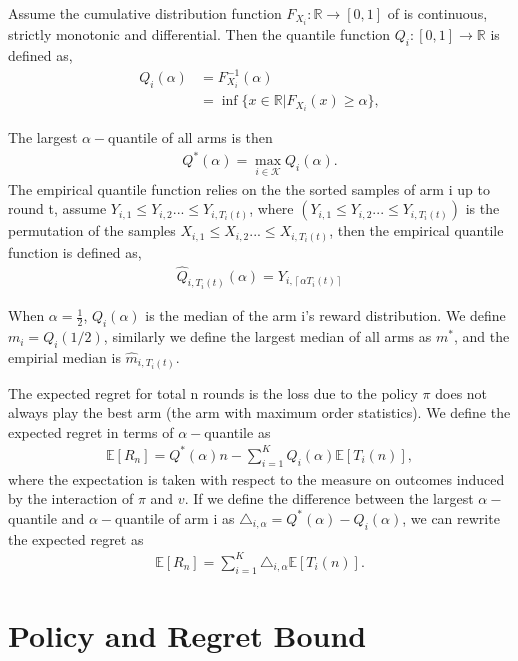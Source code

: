 \documentclass{article}
\theoremstyle{plain}
\begin{document}
    Assume the cumulative distribution function $F_{X_i}: \mathbb{R} \rightarrow [0,1]$ of  is continuous, strictly monotonic and differential. Then the quantile function $Q_{i}:  [0,1]\rightarrow \mathbb{R}$ is defined as,
\begin{align}
    Q_{i}(\alpha) &= F_{X_i}^{-1}(\alpha)\\
    &= \inf \{x \in \mathbb{R}| F_{X_i}(x) \geq \alpha\},
\end{align}

The largest $\alpha-$quantile of all arms is then
\begin{align}
    Q^\ast(\alpha) = \max_{i\in \mathcal{K}} Q_{i}(\alpha).
\end{align}
The empirical quantile function relies on the the sorted samples of arm i up to round t, assume $Y_{i,1} \leq Y_{i,2} ... \leq Y_{i,T_i(t)}$, where $(Y_{i,1} \leq Y_{i,2} ... \leq Y_{i,T_i(t)})$ is the permutation of the samples $X_{i,1} \leq X_{i,2} ... \leq X_{i,T_i(t)}$, then the empirical quantile function is defined as,
\begin{align}
    \hat{Q}_{i, T_i(t)}(\alpha) = Y_{i,\left\lceil \alpha T_i(t) \right\rceil}
\end{align}

When $\alpha = \frac{1}{2}$, $Q_i(\alpha)$ is the median of the arm i's reward distribution. We define $m_i = Q_i(1/2)$, similarly we define the largest median of all arms as $m^*$, and the empirial median is $\hat{m}_{i, T_i(t)}$.

    The expected regret for total n rounds is the loss due to the policy $\pi$ does not always play the best arm (the arm with maximum order statistics). We define the expected regret in terms of $\alpha-$quantile as
    \begin{align}
        \label{regret}
        \mathbb{E}[R_n] = Q^\ast(\alpha) n -  \sum_{i=1}^K Q_{i}(\alpha) \mathbb{E}[T_i(n)],
    \end{align}
    where the expectation is taken with respect to the measure on outcomes induced by the interaction of $\pi$ and $v$. If we define the difference between the largest $\alpha-$quantile and $\alpha-$quantile of arm i as $\triangle_{i,\alpha} = Q^\ast(\alpha) - Q_{i}(\alpha)$, we can rewrite the expected regret as
    \begin{align}
        \mathbb{E}[R_n] = \sum_{i = 1}^K \triangle_{i, \alpha} \mathbb{E}[T_i(n)].
    \end{align}

\section{Policy and Regret Bound}
\end{document}
